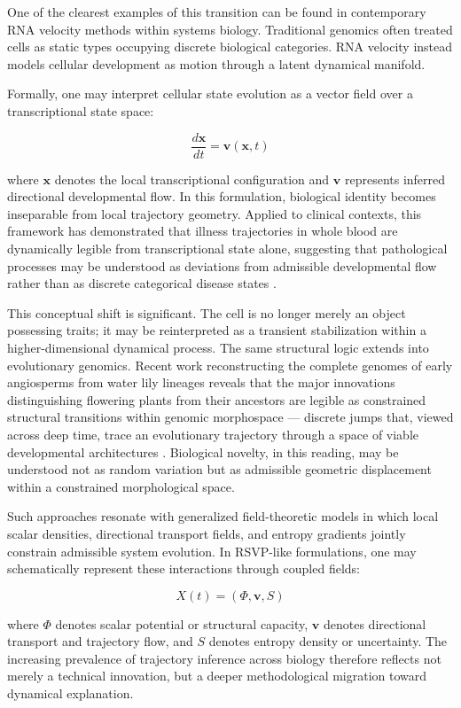 \documentclass[12pt,a4paper]{article}
\begin{document}
One of the clearest examples of this transition can be found in contemporary RNA
velocity methods within systems biology. Traditional genomics often treated cells as
static types occupying discrete biological categories. RNA velocity instead models
cellular development as motion through a latent dynamical manifold.

Formally, one may interpret cellular state evolution as a vector field over a
transcriptional state space:

\[
\frac{d\mathbf{x}}{dt} = \mathbf{v}(\mathbf{x},t)
\]

where $\mathbf{x}$ denotes the local transcriptional configuration and $\mathbf{v}$
represents inferred directional developmental flow. In this formulation, biological
identity becomes inseparable from local trajectory geometry. Applied to clinical
contexts, this framework has demonstrated that illness trajectories in whole blood
are dynamically legible from transcriptional state alone, suggesting that pathological
processes may be understood as deviations from admissible developmental flow rather
than as discrete categorical disease states \cite{RNAVelocity}.

This conceptual shift is significant. The cell is no longer merely an object
possessing traits; it may be reinterpreted as a transient stabilization within a
higher-dimensional dynamical process. The same structural logic extends into
evolutionary genomics. Recent work reconstructing the complete genomes of early
angiosperms from water lily lineages reveals that the major innovations
distinguishing flowering plants from their ancestors are legible as constrained
structural transitions within genomic morphospace --- discrete jumps that, viewed
across deep time, trace an evolutionary trajectory through a space of viable
developmental architectures \cite{WaterLily}. Biological novelty, in this reading,
may be understood not as random variation but as admissible geometric displacement
within a constrained morphological space.

Such approaches resonate with generalized field-theoretic models in which local
scalar densities, directional transport fields, and entropy gradients jointly
constrain admissible system evolution. In RSVP-like formulations, one may
schematically represent these interactions through coupled fields:

\[
X(t) = (\Phi, \mathbf{v}, S)
\]

where $\Phi$ denotes scalar potential or structural capacity, $\mathbf{v}$ denotes
directional transport and trajectory flow, and $S$ denotes entropy density or
uncertainty. The increasing prevalence of trajectory inference across biology
therefore reflects not merely a technical innovation, but a deeper methodological
migration toward dynamical explanation.
\end{document}
